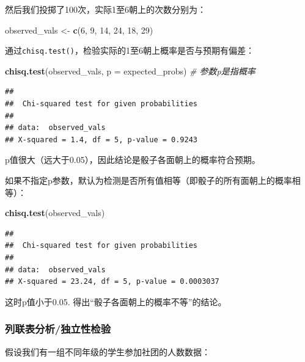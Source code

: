 \documentclass[]{book}
\newenvironment{Shaded}{\begin{snugshade}}{\end{snugshade}}
\newcommand{\CommentTok}[1]{\textcolor[rgb]{0.56,0.35,0.01}{\textit{#1}}}
\newcommand{\DataTypeTok}[1]{\textcolor[rgb]{0.13,0.29,0.53}{#1}}
\newcommand{\DecValTok}[1]{\textcolor[rgb]{0.00,0.00,0.81}{#1}}
\newcommand{\KeywordTok}[1]{\textcolor[rgb]{0.13,0.29,0.53}{\textbf{#1}}}
\newcommand{\NormalTok}[1]{#1}
\newcommand{\StringTok}[1]{\textcolor[rgb]{0.31,0.60,0.02}{#1}}
\begin{document}
然后我们投掷了100次，实际1至6朝上的次数分别为：

\begin{Shaded}
\begin{Highlighting}[]
\NormalTok{observed_vals <-}\StringTok{ }\KeywordTok{c}\NormalTok{(}\DecValTok{6}\NormalTok{, }\DecValTok{9}\NormalTok{, }\DecValTok{14}\NormalTok{, }\DecValTok{24}\NormalTok{, }\DecValTok{18}\NormalTok{, }\DecValTok{29}\NormalTok{)}
\end{Highlighting}
\end{Shaded}

通过\texttt{chisq.test()}，检验实际的1至6朝上概率是否与预期有偏差：

\begin{Shaded}
\begin{Highlighting}[]
\KeywordTok{chisq.test}\NormalTok{(observed_vals, }\DataTypeTok{p =}\NormalTok{ expected_probs) }\CommentTok{# 参数p是指概率}
\end{Highlighting}
\end{Shaded}

\begin{verbatim}
## 
##  Chi-squared test for given probabilities
## 
## data:  observed_vals
## X-squared = 1.4, df = 5, p-value = 0.9243
\end{verbatim}

p值很大（远大于0.05），因此结论是骰子各面朝上的概率符合预期。

如果不指定p参数，默认为检测是否所有值相等（即骰子的所有面朝上的概率相等）：

\begin{Shaded}
\begin{Highlighting}[]
\KeywordTok{chisq.test}\NormalTok{(observed_vals)}
\end{Highlighting}
\end{Shaded}

\begin{verbatim}
## 
##  Chi-squared test for given probabilities
## 
## data:  observed_vals
## X-squared = 23.24, df = 5, p-value = 0.0003037
\end{verbatim}

这时p值小于0.05. 得出``骰子各面朝上的概率不等''的结论。

\subsubsection{列联表分析/独立性检验}

假设我们有一组不同年级的学生参加社团的人数数据：
\end{document}
